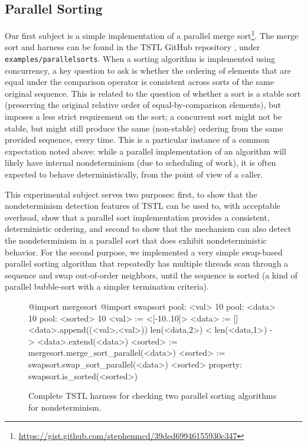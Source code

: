 \subsection{Parallel Sorting}

Our first subject is a simple implementation of a parallel merge
sort\footnote{\url{https://gist.github.com/stephenmcd/39ded69946155930c347}}.  The
merge sort and harness can be found in the TSTL GitHub repository
\cite{tstl}, under {\tt examples/parallelsorts}.  When a sorting
algorithm is implemented using concurrency, a key question to ask is
whether the ordering of elements that are equal under the comparison
operator is consistent across sorts of the same original sequence.
This is related to the question of whether a sort is a stable sort
(preserving the original relative order of equal-by-comparison elements),
but imposes a less strict requirement on the sort; a concurrent sort
might not be stable, but might still produce the same (non-stable)
ordering from the same provided sequence, every time.  This is a
particular instance of a common expectation noted above:  while a parallel
implementation of an algorithm will likely have internal
nondeterminism (due to scheduling of work), it is often expected to
behave deterministically, from the point of view of a caller.

This experimental subject serves two purposes:  first, to show that the
nondeterminism detection features of TSTL can be used to, with
acceptable overhead, show that a parallel sort implementation provides
a consistent, deterministic ordering, and second to show that the
mechanism can also detect the nondeterminism in a parallel sort that
does exhibit nondeterministic behavior.  For the second purpose, we
implemented a very simple swap-based parallel sorting algorithm that
repeatedly has multiple threads scan through a sequence and swap
out-of-order neighbors, until the sequence is sorted (a kind of
parallel bubble-sort with a simpler termination criteria).

\begin{figure}
{\scriptsize
\begin{code}
@import mergesort
@import swapsort
\vspace{0.1in}
pool: <val> 10
pool: <data> 10
pool: <sorted> 10
\vspace{0.1in}
<val> := <[-10..10]>
\vspace{0.1in}
<data> := []
<data>.append((<val>,<val>))
len(<data,2>) < len(<data,1>) -> <data>.extend(<data>)
\vspace{0.1in}
<sorted> := mergesort.merge\_sort\_parallel(<data>)
<sorted> := swapsort.swap\_sort\_parallel(<data>)
<sorted>
\vspace{0.1in}
property: swapsort.is\_sorted(<sorted>)
\end{code}
}
\caption {Complete TSTL harness for checking two parallel sorting
  algorithms for nondeterminism.}
\label{fig:parallelcode}
\end{figure}


